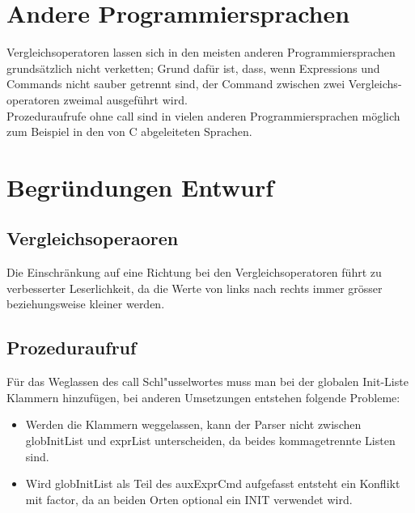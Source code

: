 \documentclass[a4paper,10pt]{article}
\begin{document}
\section{Andere Programmiersprachen}
Vergleichsoperatoren lassen sich in den meisten anderen Programmiersprachen grunds\"atzlich nicht verketten; Grund daf\"ur ist, dass, wenn Expressions und Commands nicht sauber getrennt sind, der Command zwischen zwei Vergleichs-operatoren zweimal ausgef\"uhrt wird.\\
Prozeduraufrufe ohne call sind in vielen anderen Programmiersprachen
m\"oglich zum Beispiel in den von C abgeleiteten Sprachen.
\section{Begr\"undungen Entwurf}
\subsection{Vergleichsoperaoren}
Die Einschr\"ankung auf eine Richtung bei den Vergleichsoperatoren
f\"uhrt zu verbesserter Leserlichkeit, da die Werte von links nach 
rechts immer gr\"osser beziehungsweise kleiner werden.
\subsection{Prozeduraufruf}
F\"ur das Weglassen des call Schl"usselwortes muss man bei der 
globalen Init-Liste Klammern hinzuf\"ugen, bei anderen Umsetzungen 
entstehen folgende Probleme:\\
\begin{itemize}
\item Werden die Klammern weggelassen, kann der Parser nicht zwischen
globInitList und exprList unterscheiden, da beides kommagetrennte
Listen sind.
\item Wird globInitList als Teil des auxExprCmd aufgefasst entsteht
ein Konflikt mit factor, da an beiden Orten optional ein INIT
verwendet wird.
\end{itemize}
\end{document}
